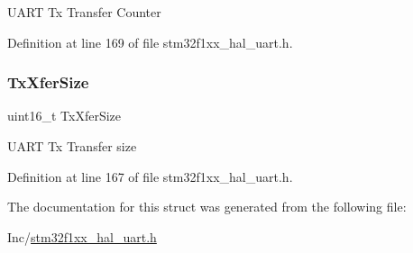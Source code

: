 U\+A\+RT Tx Transfer Counter 

Definition at line 169 of file stm32f1xx\+\_\+hal\+\_\+uart.\+h.

\mbox{\label{struct_u_a_r_t___handle_type_def_a80907b65d6f9541bc0dee444d16bc45b}} 
\subsubsection{\texorpdfstring{Tx\+Xfer\+Size}{TxXferSize}}
{\footnotesize\ttfamily uint16\+\_\+t Tx\+Xfer\+Size}

U\+A\+RT Tx Transfer size 

Definition at line 167 of file stm32f1xx\+\_\+hal\+\_\+uart.\+h.



The documentation for this struct was generated from the following file\+:\begin{DoxyCompactItemize}
\item 
Inc/\hyperlink{stm32f1xx__hal__uart_8h}{stm32f1xx\+\_\+hal\+\_\+uart.\+h}\end{DoxyCompactItemize}

